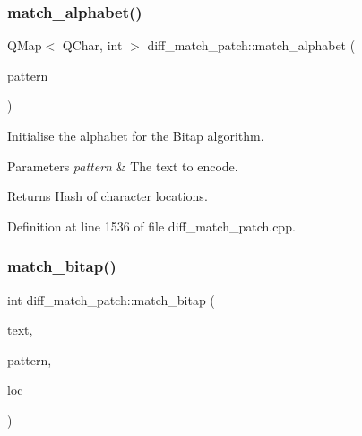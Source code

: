 \mbox{\label{classdiff__match__patch_a106c32e9978fc36cafe6f1bc8f81bf8d}} 
\subsubsection{\texorpdfstring{match\+\_\+alphabet()}{match\_alphabet()}}
{\footnotesize\ttfamily Q\+Map$<$ Q\+Char, int $>$ diff\+\_\+match\+\_\+patch\+::match\+\_\+alphabet (\begin{DoxyParamCaption}\item[{const Q\+String \&}]{pattern }\end{DoxyParamCaption})\hspace{0.3cm}{\ttfamily [protected]}}

Initialise the alphabet for the Bitap algorithm. 
\begin{DoxyParams}{Parameters}
{\em pattern} & The text to encode. \\
\hline
\end{DoxyParams}
\begin{DoxyReturn}{Returns}
Hash of character locations. 
\end{DoxyReturn}


Definition at line 1536 of file diff\+\_\+match\+\_\+patch.\+cpp.

\mbox{\label{classdiff__match__patch_a9d8ebaab2f4cd4fb2ab01a3110c56b86}} 
\subsubsection{\texorpdfstring{match\+\_\+bitap()}{match\_bitap()}}
{\footnotesize\ttfamily int diff\+\_\+match\+\_\+patch\+::match\+\_\+bitap (\begin{DoxyParamCaption}\item[{const Q\+String \&}]{text,  }\item[{const Q\+String \&}]{pattern,  }\item[{int}]{loc }\end{DoxyParamCaption})\hspace{0.3cm}{\ttfamily [protected]}}

